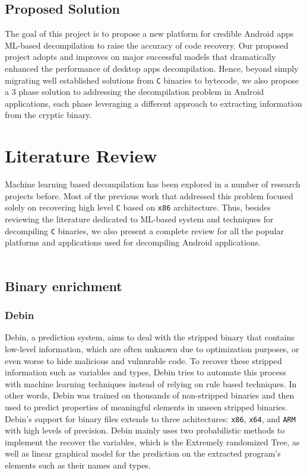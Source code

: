 \documentclass[conference,a4paper]{IEEEtran}
\begin{document}
\subsection{Proposed Solution}
The goal of this project is to propose a new platform for credible Android apps ML-based decompilation to raise the accuracy of code recovery.
Our proposed project adopts and improves on major successful models that dramatically enhanced the performance of desktop apps decompilation.
Hence, beyond simply migrating well established solutions from \verb|C| binaries to bytecode, we also propose a 3 phase solution to addressing the decompilation problem in Android applications, each phase leveraging a different approach to extracting information from the cryptic binary.

\section{Literature Review}
Machine learning based decompilation has been explored in a number of research projects before.
Most of the previous work that addressed this problem focused solely on recovering high level \verb|C| based on \verb|x86| architecture.
Thus, besides reviewing the literature dedicated to ML-based system and techniques for decompiling \verb|C| binaries, we also present a complete review for all the popular platforms and applications used for decompiling Android applications. \\\\


\subsection{Binary enrichment}

\subsubsection{Debin}

Debin, a prediction system, aims to deal with the stripped binary that contains low-level information, which are often unknown due to optimization purposes, or even worse to hide malicious and vulnurable code.
To recover these stripped information such as variables and types, Debin tries to automate this process with machine learning techniques instead of relying on rule based techniques. In other words, Debin was trained on thousands of non-stripped binaries and then used to predict properties of meaningful elements in unseen stripped binaries.
Debin's support for binary files extends to three achitectures: \verb|x86|, \verb|x64|, and \verb|ARM| with high levels of precision.
Debin mainly uses two probabilistic methods to implement the recover the variables, which is the Extremely randomized Tree, as well as linear graphical model for the prediction on the extracted program's elements such as their names and types.
\end{document}

